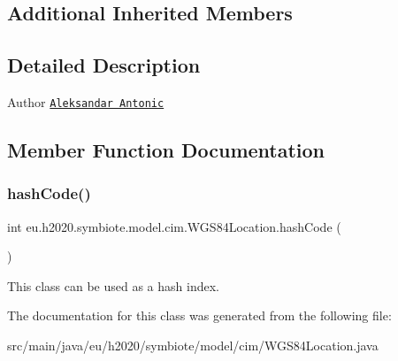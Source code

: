 \subsection*{Additional Inherited Members}


\subsection{Detailed Description}
\begin{DoxyAuthor}{Author}
\href{mailto:aleksandar.antonic@fer.hr}{\tt Aleksandar Antonic} 
\end{DoxyAuthor}


\subsection{Member Function Documentation}
\mbox{\label{classeu_1_1h2020_1_1symbiote_1_1model_1_1cim_1_1WGS84Location_aff77c8c18f4b41d2c3c31ce3d0b5476b}} 
\subsubsection{\texorpdfstring{hash\+Code()}{hashCode()}}
{\footnotesize\ttfamily int eu.\+h2020.\+symbiote.\+model.\+cim.\+W\+G\+S84\+Location.\+hash\+Code (\begin{DoxyParamCaption}{ }\end{DoxyParamCaption})}

This class can be used as a hash index. 

The documentation for this class was generated from the following file\+:\begin{DoxyCompactItemize}
\item 
src/main/java/eu/h2020/symbiote/model/cim/W\+G\+S84\+Location.\+java\end{DoxyCompactItemize}
